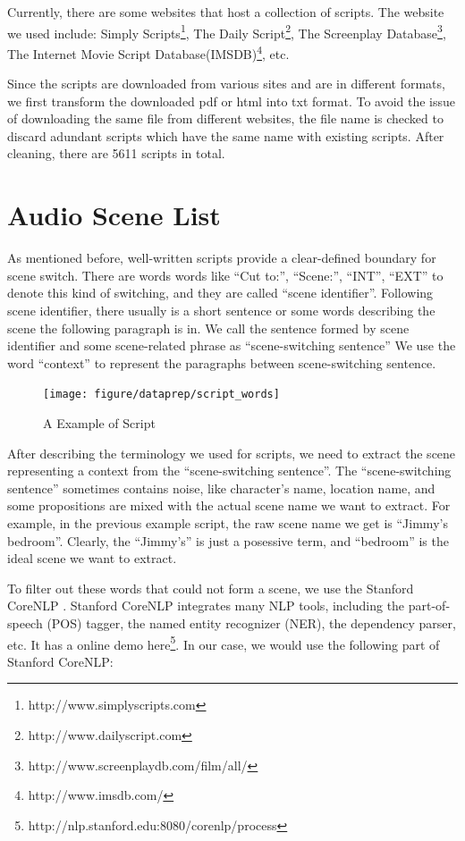 Currently, there are some websites that host a collection of scripts. 
The website we used include: Simply Scripts\footnote{http://www.simplyscripts.com}, The Daily Script\footnote{http://www.dailyscript.com}, The Screenplay Database\footnote{http://www.screenplaydb.com/film/all/}, The Internet Movie Script Database(IMSDB)\footnote{http://www.imsdb.com/}, etc. 

Since the scripts are downloaded from various sites and are in different formats, we first transform the downloaded pdf or html into txt format. 
To avoid the issue of downloading the same file from different websites, the file name is checked to discard adundant scripts which have the same name with existing scripts. 
After cleaning, there are 5611 scripts in total. 

\section{Audio Scene List}
As mentioned before, well-written scripts provide a clear-defined boundary for scene switch. 
There are words words like ``Cut to:'', ``Scene:'', ``INT'', ``EXT'' to denote this kind of switching, and they are called ``scene identifier''.  
Following scene identifier, there usually is a short sentence or some words describing the scene the following paragraph is in. 
We call the sentence formed by scene identifier and some scene-related phrase as ``scene-switching sentence''
We use the word ``context'' to represent the paragraphs between scene-switching sentence. 

\begin{figure}[htb]
\centering
\hspace*{-0.5cm}
\texttt{[image: figure/dataprep/script\_words]}
\caption{A Example of Script}
\label{fig:script_words}
\end{figure}

After describing the terminology we used for scripts, we need to extract the scene representing a context from the ``scene-switching sentence''. 
The ``scene-switching sentence'' sometimes contains noise, like character's name, location name, and some propositions are mixed with the actual scene name we want to extract. 
For example, in the previous example script, the raw scene name we get is ``Jimmy's bedroom''. 
Clearly, the ``Jimmy's'' is just a posessive term, and ``bedroom'' is the ideal scene we want to extract. 

To filter out these words that could not form a scene, we use the Stanford CoreNLP \cite{manning2014corenlp}. 
Stanford CoreNLP integrates many NLP tools, including the part-of-speech (POS) tagger, the named entity recognizer (NER), the dependency parser, etc. 
It has a online demo here\footnote{http://nlp.stanford.edu:8080/corenlp/process}. 
In our case, we would use the following part of Stanford CoreNLP:
 
